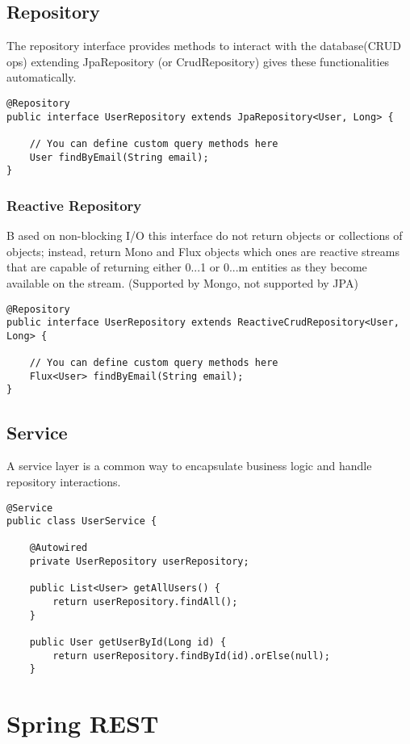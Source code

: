 \documentclass[a4paper, 12pt]{article}
\begin{document}
    \subsection{Repository}
    The repository interface provides methods to interact with the database(CRUD ops) extending JpaRepository (or CrudRepository) gives these functionalities automatically.

    \begin{lstlisting}
@Repository
public interface UserRepository extends JpaRepository<User, Long> {

    // You can define custom query methods here
    User findByEmail(String email);
}
    \end{lstlisting}

    \subsubsection{Reactive Repository}
    B ased on non-blocking I/O this interface do not
    return objects or collections of objects; instead, return Mono and Flux objects which ones are reactive streams that are
    capable of returning either 0...1 or 0...m entities as they become available on the stream. (Supported by Mongo, not supported by JPA)
    \begin{lstlisting}
@Repository
public interface UserRepository extends ReactiveCrudRepository<User, Long> {

    // You can define custom query methods here
    Flux<User> findByEmail(String email);
}
    \end{lstlisting}

    \subsection{Service}
    A service layer is a common way to encapsulate business logic and handle repository interactions.
    \begin{lstlisting}
@Service
public class UserService {

    @Autowired
    private UserRepository userRepository;

    public List<User> getAllUsers() {
        return userRepository.findAll();
    }

    public User getUserById(Long id) {
        return userRepository.findById(id).orElse(null);
    }
    \end{lstlisting}
    \newpage


    \section{Spring REST}
\end{document}
